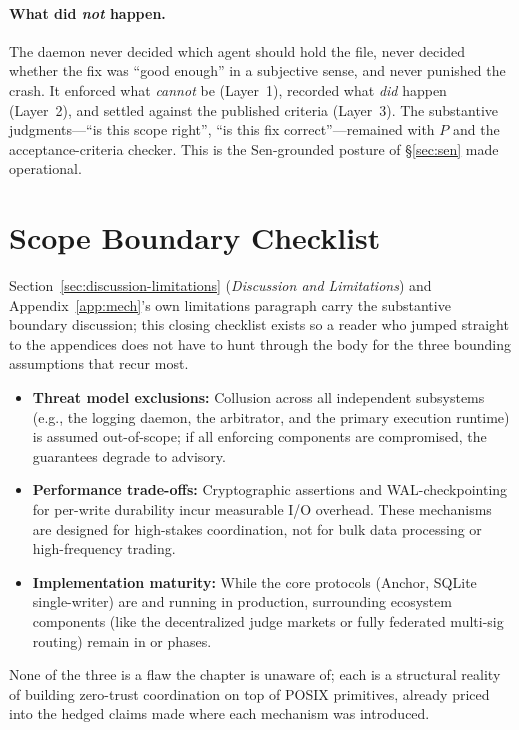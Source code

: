 \documentclass[11pt,a4paper]{article}
\theoremstyle{definition}
\theoremstyle{remark}
\begin{document}
\paragraph{What did \emph{not} happen.} The daemon never decided which agent should hold the file, never decided whether the fix was ``good enough'' in a subjective sense, and never punished the crash. It enforced what \emph{cannot} be (Layer~1), recorded what \emph{did} happen (Layer~2), and settled against the published criteria (Layer~3). The substantive judgments---``is this scope right'', ``is this fix correct''---remained with $P$ and the acceptance-criteria checker. This is the Sen-grounded posture of \S\ref{sec:sen} made operational.

\section{Scope Boundary Checklist}\label{sec:bonded-limitations-boundaries}

Section~\ref{sec:discussion-limitations} (\emph{Discussion and Limitations}) and Appendix~\ref{app:mech}'s own limitations paragraph carry the substantive boundary discussion; this closing checklist exists so a reader who jumped straight to the appendices does not have to hunt through the body for the three bounding assumptions that recur most.

\begin{itemize}
    \item \textbf{Threat model exclusions:} Collusion across all independent subsystems (e.g., the logging daemon, the arbitrator, and the primary execution runtime) is assumed out-of-scope; if all enforcing components are compromised, the guarantees degrade to advisory.
    \item \textbf{Performance trade-offs:} Cryptographic assertions and WAL-checkpointing for per-write durability incur measurable I/O overhead. These mechanisms are designed for high-stakes coordination, not for bulk data processing or high-frequency trading.
    \item \textbf{Implementation maturity:} While the core protocols (Anchor, SQLite single-writer) are  and running in production, surrounding ecosystem components (like the decentralized judge markets or fully federated multi-sig routing) remain in  or  phases.
\end{itemize}

None of the three is a flaw the chapter is unaware of; each is a structural reality of building zero-trust coordination on top of POSIX primitives, already priced into the hedged claims made where each mechanism was introduced.
\end{document}
